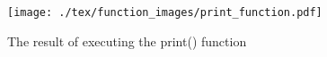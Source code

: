 \begin{figure}[H]
    \texttt{[image: ./tex/function\_images/print\_function.pdf]}
    \caption{The result of executing the print() function} \label{fig:print_function_result}
\end{figure}